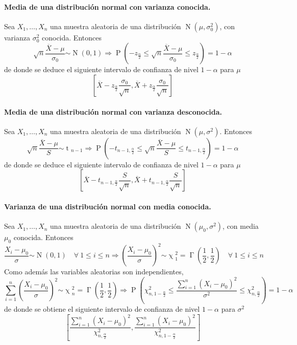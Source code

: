 \documentclass[11pt]{article}
\theoremstyle{plain}
\theoremstyle{definition}
\theoremstyle{remark}
\newcommand{\proba}{\ensuremath{\operatorname{P}}}  %
\newcommand{\foralle}{\ensuremath{\forall \ }}  %
\newcommand{\dists}[1]{\ensuremath{\operatorname{#1}}}  %
\newcommand{\dist}[1]{\ensuremath{\sim \operatorname{#1}}}  %
\begin{document}
      \paragraph{Media de una distribución normal con varianza conocida.} Sea $X_1, \dots, X_n$ una muestra aleatoria de una distribución $\dists{N}(\mu,\sigma_0^2)$, con varianza $\sigma_0^2$ conocida. Entonces
      \[ \sqrt{n} \frac{\overline{X} - \mu}{\sigma_0} \dist{N} (0,1) \Rightarrow \proba \left( -z_{\frac{\alpha}{2}} \leq \sqrt{n} \frac{\overline{X} - \mu}{\sigma_0} \leq z_{\frac{\alpha}{2}} \right) = 1 - \alpha \]
      de donde se deduce el siguiente intervalo de confianza de nivel $1 - \alpha$ para $\mu$
      \[ \left[ \overline{X} - z_{\frac{\alpha}{2}} \frac{\sigma_0}{\sqrt{n}}, \overline{X} + z_{\frac{\alpha}{2}} \frac{\sigma_0}{\sqrt{n}} \right] \]

      \paragraph{Media de una distribución normal con varianza desconocida.} Sea $X_1, \dots, X_n$ una muestra aleatoria de una distribución $\dists{N}(\mu,\sigma^2)$. Entonces
      \[ \sqrt{n} \frac{\overline{X} - \mu}{S} \dist{t}_{n-1} \Rightarrow \proba \left( -t_{n - 1, \frac{\alpha}{2}} \leq \sqrt{n} \frac{\overline{X} - \mu}{S} \leq t_{n - 1, \frac{\alpha}{2}} \right) = 1 - \alpha \]
      de donde se deduce el siguiente intervalo de confianza de nivel $1 - \alpha$ para $\mu$
      \[ \left[ \overline{X} - t_{n - 1, \frac{\alpha}{2}} \frac{S}{\sqrt{n}}, \overline{X} + t_{n - 1, \frac{\alpha}{2}} \frac{S}{\sqrt{n}} \right] \]

      \paragraph{Varianza de una distribución normal con media conocida.} Sea $X_1, \dots, X_n$ una muestra aleatoria de una distribución $\dists{N}(\mu_0,\sigma^2)$, con media $\mu_0$ conocida. Entonces
      \[ \frac{X_i - \mu_0}{\sigma} \dist{N}(0,1) \quad \foralle 1 \leq i \leq n \Rightarrow \left( \frac{X_i - \mu_0}{\sigma} \right)^2 \dist{\chi}_1^2 = \dists{\Gamma}\left( \frac{1}{2}, \frac{1}{2} \right) \quad \foralle 1 \leq i \leq n \]
      Como además las variables aleatorias son independientes,
      \[ \sum_{i = 1}^n \left( \frac{X_i - \mu_0}{\sigma} \right)^2 \dist{\chi}_n^2 = \dists{\Gamma}\left( \frac{1}{2}, \frac{1}{2} \right) \Rightarrow \proba\left( \chi_{n, 1 - \frac{\alpha}{2}}^2 \leq \frac{\sum_{i=1}^n (X_i - \mu_0)^2}{\sigma^2} \leq \chi_{n, \frac{\alpha}{2}}^2 \right) = 1 -\alpha \]
      de donde se obtiene el siguiente intervalo de confianza de nivel $1 - \alpha$ para $\sigma^2$
      \[ \left[ \frac{\sum_{i = 1}^n (X_i - \mu_0)^2}{\chi_{n,\frac{\alpha}{2}}^2} , \frac{\sum_{i = 1}^n (X_i - \mu_0)^2}{\chi_{n,1 - \frac{\alpha}{2}}^2} \right] \]
\end{document}
